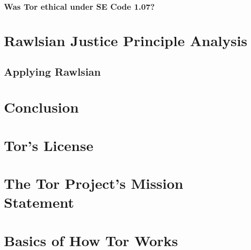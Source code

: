 \documentclass[11pt]{article}
\begin{document}
\begin{multicols}{2}
\subsubsection{Was Tor ethical under SE Code 1.07?}

\section{Rawlsian Justice Principle Analysis}


\subsection{Applying Rawlsian}


\section{Conclusion} 


\end{multicols} \newpage

\appendix

\section{Tor's License}
\label{Tor:License}


\section{The Tor Project's Mission Statement}
\label{Tor:MissionStatement}



\section{Basics of How Tor Works}
\label{Tor:HowTorWorks}
\end{document}
